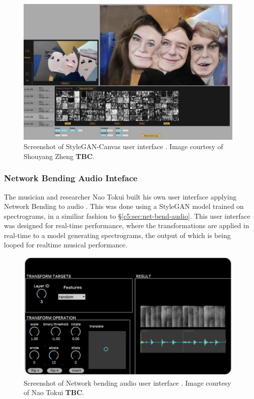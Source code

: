 \begin{figure}[!htb]
    \centering
    \captionsetup{justification=centering}
    \includegraphics[width=1\textwidth]{figures/c7_impact/net-bend-technical/stylegan-canvas.png}
    \caption[StyleGAN-Canvas user interface]{Screenshot of StyleGAN-Canvas user interface \citep{zheng2023stylegan}. Image courtesy of Shouyang Zheng \textbf{TBC}.}
    \label{fig:c7:stylegan-canvas}
\end{figure}

\subsubsection{Network Bending Audio Inteface}
\label{c7:subsubsec:naotokui}

The musician and researcher Nao Tokui built his own user interface applying Network Bending to audio \cite{tokui2023bending}. 
This was done using a StyleGAN model trained on spectrograms, in a similiar fashion to \S \ref{c5:sec:net-bend-audio}.
This user interface was designed for real-time performance, where the transformations are applied in real-time to a model generating spectrograms, the output of which is being looped for realtime musical performance.

\begin{figure}[!htb]
    \centering
    \captionsetup{justification=centering}
    \includegraphics[width=1\textwidth]{figures/c7_impact/net-bend-technical/nao-tokui-stylegan-audio.png}
    \caption[Network bending audio user interface]{Screenshot of Network bending audio user interface \citep{tokui2023bending}. Image courtesy of Nao Tokui \textbf{TBC}.}
    \label{fig:c7:stylegan-canvas}
\end{figure}

